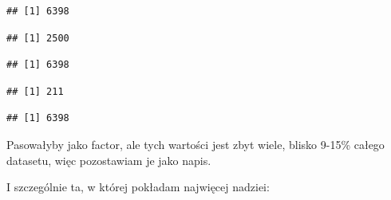 \documentclass[
]{article}
\newenvironment{Shaded}{\begin{snugshade}}{\end{snugshade}}
\newcommand{\FunctionTok}[1]{\textcolor[rgb]{0.13,0.29,0.53}{\textbf{#1}}}
\newcommand{\NormalTok}[1]{#1}
\newcommand{\SpecialCharTok}[1]{\textcolor[rgb]{0.81,0.36,0.00}{\textbf{#1}}}
\begin{document}
\begin{verbatim}
## [1] 6398
\end{verbatim}

\begin{Shaded}
\end{Shaded}

\begin{verbatim}
## [1] 2500
\end{verbatim}

\begin{Shaded}
\end{Shaded}

\begin{verbatim}
## [1] 6398
\end{verbatim}

\begin{Shaded}
\end{Shaded}

\begin{verbatim}
## [1] 211
\end{verbatim}

\begin{Shaded}
\end{Shaded}

\begin{verbatim}
## [1] 6398
\end{verbatim}

Pasowałyby jako factor, ale tych wartości jest zbyt wiele, blisko 9-15\%
całego datasetu, więc pozostawiam je jako napis.

I szczególnie ta, w której pokładam najwięcej nadziei:

\begin{Shaded}
\end{Shaded}
\end{document}
